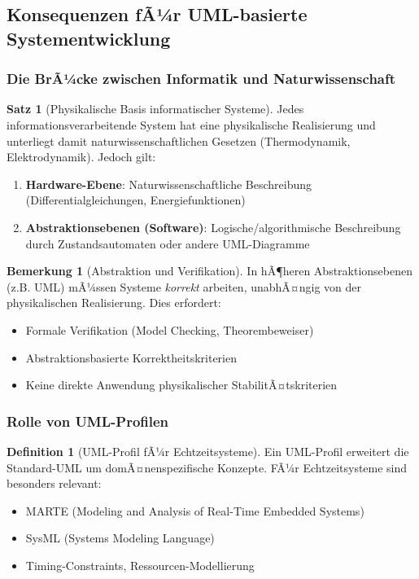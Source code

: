 ﻿\documentclass[a4paper,12pt]{scrreprt}
\theoremstyle{definition}
\newtheorem{definition}{Definition}[section]
\newtheorem{bemerkung}{Bemerkung}[section]
\newtheorem{satz}{Satz}[section]
\begin{document}
\subsection{Konsequenzen fÃ¼r UML-basierte Systementwicklung}

\subsubsection{Die BrÃ¼cke zwischen Informatik und Naturwissenschaft}

\begin{satz}[Physikalische Basis informatischer Systeme]
	Jedes informationsverarbeitende System hat eine physikalische Realisierung und unterliegt damit naturwissenschaftlichen Gesetzen (Thermodynamik, Elektrodynamik). Jedoch gilt:
	\begin{enumerate}
		\item[-] \textbf{Hardware-Ebene}: Naturwissenschaftliche Beschreibung (Differentialgleichungen, Energiefunktionen)
		\item[-] \textbf{Abstraktionsebenen (Software)}: Logische/algorithmische Beschreibung durch Zu\-stands\-automaten oder andere UML-Diagramme
	\end{enumerate}
\end{satz}

\begin{bemerkung}[Abstraktion und Verifikation]
	In hÃ¶heren Abstraktionsebenen (z.B. UML) mÃ¼ssen Systeme \textit{korrekt} arbeiten, unabhÃ¤ngig von der physikalischen Realisierung. Dies erfordert:
	\begin{itemize}
		\item[-] Formale Verifikation (Model Checking, Theorembeweiser)
		\item[-] Abstraktionsbasierte Korrektheitskriterien
		\item[-] Keine direkte Anwendung physikalischer StabilitÃ¤tskriterien
	\end{itemize}
\end{bemerkung}

\subsubsection{Rolle von UML-Profilen}

\begin{definition}[UML-Profil fÃ¼r Echtzeitsysteme]
	Ein UML-Profil erweitert die Standard-UML um domÃ¤nenspezifische Konzepte. FÃ¼r Echtzeitsysteme sind besonders relevant:
	\begin{itemize}
		\item[-] MARTE (Modeling and Analysis of Real-Time Embedded Systems)
		\item[-] SysML (Systems Modeling Language)
		\item[-] Timing-Constraints, Ressourcen-Modellierung
	\end{itemize}
\end{definition}
\end{document}
